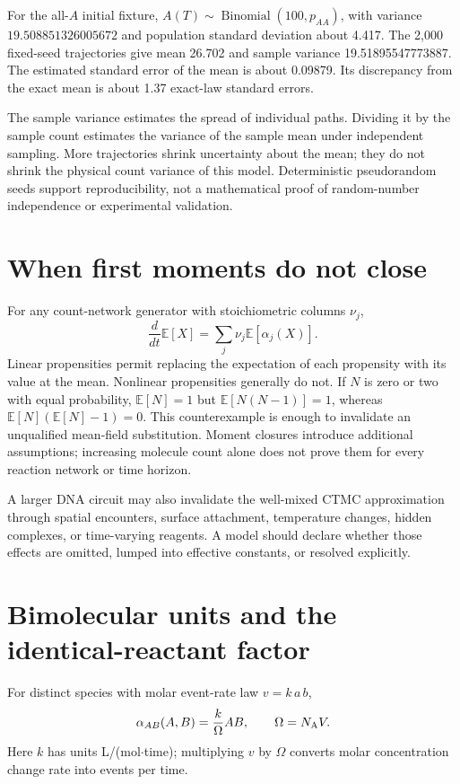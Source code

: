 For the all-$A$ initial fixture, $A(T)\sim\operatorname{Binomial}(100,p_{AA})$,
with variance $19.508851326005672$ and population standard deviation about 4.417.
The 2,000 fixed-seed trajectories give mean 26.702 and sample variance
19.51895547773887. The estimated standard error of the mean is about 0.09879.
Its discrepancy from the exact mean is about 1.37 exact-law standard errors.

The sample variance estimates the spread of individual paths. Dividing it by the
sample count estimates the variance of the sample mean under independent sampling.
More trajectories shrink uncertainty about the mean; they do not shrink the
physical count variance of this model. Deterministic pseudorandom seeds support
reproducibility, not a mathematical proof of random-number independence or
experimental validation.

\section{When first moments do not close}
For any count-network generator with stoichiometric columns $\nu_j$,
\[
\frac{d}{dt}\mathbb E[X]=\sum_j\nu_j\mathbb E[\alpha_j(X)].
\]
Linear propensities permit replacing the expectation of each propensity with its
value at the mean. Nonlinear propensities generally do not. If $N$ is zero or two
with equal probability, $\mathbb E[N]=1$ but
$\mathbb E[N(N-1)]=1$, whereas $\mathbb E[N](\mathbb E[N]-1)=0$.
This counterexample is enough to invalidate an unqualified mean-field substitution.
Moment closures introduce additional assumptions; increasing molecule count alone
does not prove them for every reaction network or time horizon.

A larger DNA circuit may also invalidate the well-mixed CTMC approximation through
spatial encounters, surface attachment, temperature changes, hidden complexes,
or time-varying reagents. A model should declare whether those effects are omitted,
lumped into effective constants, or resolved explicitly.

\section{Bimolecular units and the identical-reactant factor}
For distinct species with molar event-rate law $v=k\,a\,b$,
\[
\alpha_{AB}(A,B)=\frac{k}{\Omega}AB,\qquad
\Omega=N_{\rm A}V.
\]
Here $k$ has units L/(mol$\cdot$time); multiplying $v$ by $\Omega$ converts
molar concentration change rate into events per time.


